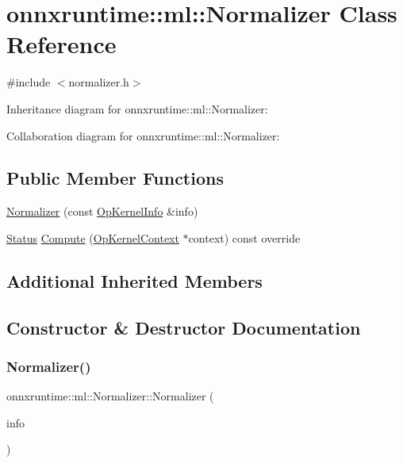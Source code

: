 \hypertarget{classonnxruntime_1_1ml_1_1Normalizer}{}\section{onnxruntime\+:\+:ml\+:\+:Normalizer Class Reference}
\label{classonnxruntime_1_1ml_1_1Normalizer}


{\ttfamily \#include $<$normalizer.\+h$>$}



Inheritance diagram for onnxruntime\+:\+:ml\+:\+:Normalizer\+:


Collaboration diagram for onnxruntime\+:\+:ml\+:\+:Normalizer\+:
\subsection*{Public Member Functions}
\begin{DoxyCompactItemize}
\item 
\mbox{\hyperlink{classonnxruntime_1_1ml_1_1Normalizer_abf6324329576df295b1ad15ea29551c5}{Normalizer}} (const \mbox{\hyperlink{classonnxruntime_1_1OpKernelInfo}{Op\+Kernel\+Info}} \&info)
\item 
\mbox{\hyperlink{classonnxruntime_1_1common_1_1Status}{Status}} \mbox{\hyperlink{classonnxruntime_1_1ml_1_1Normalizer_a5e5ba42fda13b3818698b51f000ceacd}{Compute}} (\mbox{\hyperlink{classonnxruntime_1_1OpKernelContext}{Op\+Kernel\+Context}} $\ast$context) const override
\end{DoxyCompactItemize}
\subsection*{Additional Inherited Members}


\subsection{Constructor \& Destructor Documentation}
\mbox{\label{classonnxruntime_1_1ml_1_1Normalizer_abf6324329576df295b1ad15ea29551c5}} 
\subsubsection{\texorpdfstring{Normalizer()}{Normalizer()}}
{\footnotesize\ttfamily onnxruntime\+::ml\+::\+Normalizer\+::\+Normalizer (\begin{DoxyParamCaption}\item[{const \mbox{\hyperlink{classonnxruntime_1_1OpKernelInfo}{Op\+Kernel\+Info}} \&}]{info }\end{DoxyParamCaption})\hspace{0.3cm}{\ttfamily [inline]}}



